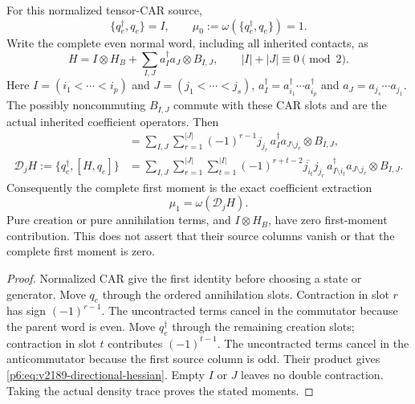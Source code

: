 \documentclass[12pt,a4paper]{article}
\begin{document}
\begin{theorem}
\label{p6:thm:v2189-complete-word-hessian}
For this normalized tensor-CAR source,
\[
 \{q_e^\dagger,q_e\}=I,\qquad
 \boxed{\mu_0:=\omega(\{q_e^\dagger,q_e\})=1.}
\]
Write the complete even normal word, including all inherited contacts, as
\[
 H=I\otimes H_B+
   \sum_{I,J}a_I^\dagger a_J\otimes B_{I,J},\qquad
 |I|+|J|\equiv0\pmod2.
\]
Here $I=(i_1<\cdots<i_p)$ and $J=(j_1<\cdots<j_s)$,
$a_I^\dagger=a_{i_1}^\dagger\cdots a_{i_p}^\dagger$ and
$a_J=a_{j_s}\cdots a_{j_1}$. The possibly noncommuting $B_{I,J}$ commute
with these CAR slots and are the actual inherited coefficient operators.
Then
\begin{align}
 [H,q_e]
 &=\sum_{I,J}\sum_{r=1}^{|J|}(-1)^{r-1}j_{j_r}\,
   a_I^\dagger a_{J\setminus j_r}\otimes B_{I,J},
   \label{p6:eq:v2189-complete-source-column}\\
 \mathcal D_jH:=\{q_e^\dagger,[H,q_e]\}
 &=\sum_{I,J}\sum_{r=1}^{|J|}\sum_{t=1}^{|I|}
   (-1)^{r+t-2}\overline{j_{i_t}}j_{j_r}\,
   a_{I\setminus i_t}^\dagger a_{J\setminus j_r}\otimes B_{I,J}.
   \label{p6:eq:v2189-directional-hessian}
\end{align}
Consequently the complete first moment is the exact coefficient extraction
\[
 \boxed{\mu_1=\omega(\mathcal D_jH).}
\]
Pure creation or pure annihilation terms, and $I\otimes H_B$, have zero
first-moment contribution. This does not assert that their source columns
vanish or that the complete first moment is zero.
\end{theorem}
\begin{proof}
Normalized CAR give the first identity before choosing a state or generator.
Move $q_e$ through the ordered annihilation slots. Contraction in slot $r$
has sign $(-1)^{r-1}$. The uncontracted terms cancel in the commutator
because the parent word is even. Move $q_e^\dagger$ through the remaining
creation slots; contraction in slot $t$ contributes $(-1)^{t-1}$.
The uncontracted terms cancel in the anticommutator because the first
source column is odd. Their product gives
\eqref{p6:eq:v2189-directional-hessian}. Empty $I$ or $J$ leaves no double
contraction. Taking the actual density trace proves the stated moments.
\end{proof}
\end{document}
